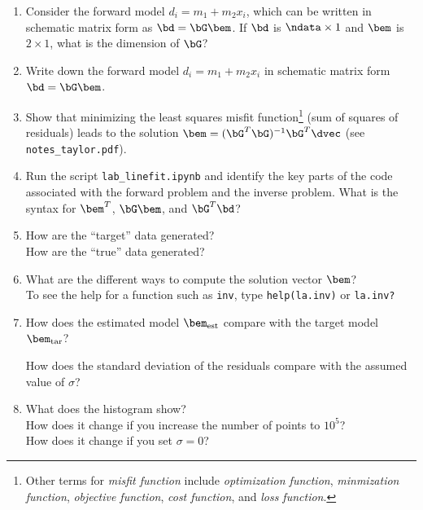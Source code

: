 \documentclass[11pt,titlepage,fleqn]{article}
\begin{document}
\begin{enumerate}
\item Consider the forward model $d_i = m_1 + m_2 x_i$, which can be written in schematic matrix form as $\bd = \bG\bem$. If $\bd$ is $\ndata \times 1$ and $\bem$ is $2 \times 1$, what is the dimension of $\bG$?

\vertgap

\item Write down the forward model $d_i = m_1 + m_2 x_i$ in schematic matrix form $\bd = \bG\bem$.

\vertgap
\vertgap
\vertgap
\vertgap
\vertgap
\vertgap


\item Show that minimizing the least squares misfit function\footnote{Other terms for {\em misfit function} include {\em optimization function}, {\em minmization function}, {\em objective function}, {\em cost function}, and {\em loss function}. } (\ie sum of squares of residuals) leads to the solution $\bem = (\bG^T\bG)^{-1}\bG^T\dvec$ (see \verb+notes_taylor.pdf+).

\pagebreak
\item Run the script \verb+lab_linefit.ipynb+ and identify the key parts of the code associated with the forward problem and the inverse problem. What is the syntax for $\bem^T$, $\bG\bem$, and $\bG^T\bd$?

\vertgap

\item How are the ``target'' data generated? \\
How are the ``true'' data generated?


\vertgap

\item What are the different ways to compute the solution vector $\bem$? \\
To see the help for a function such as \verb+inv+, type \verb+help(la.inv)+ or \verb+la.inv?+

\vertgap

\item How does the estimated model $\bem_{\rm est}$ compare with the target model $\bem_{\rm tar}$?

\vertgap

How does the standard deviation of the residuals compare with the assumed value of $\sigma$?

\vertgap

\item What does the histogram show? \\
How does it change if you increase the number of points to $10^5$? \\
How does it change if you set $\sigma = 0$?


\end{enumerate}
\end{document}
